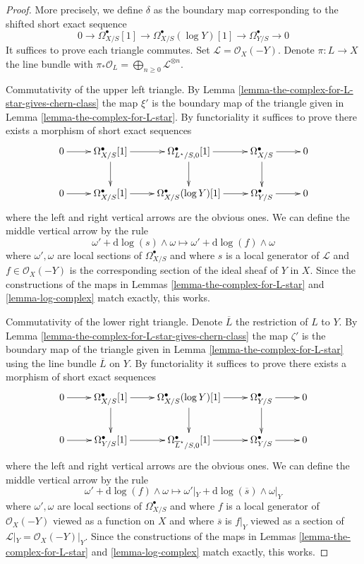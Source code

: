 \documentclass[10pt,a4paper]{amsart}
\theoremstyle{plain}
\theoremstyle{definition}
\theoremstyle{remark}
\numberwithin{equation}{subsection}
\begin{document}
\begin{proof}
More precisely, we define $\delta$ as the boundary map corresponding to the
shifted short exact sequence
$$
0 \to \Omega^\bullet_{X/S}[1] \to
\Omega^\bullet_{X/S}(\log Y)[1] \to
\Omega^\bullet_{Y/S} \to 0
$$
It suffices to prove each triangle commutes. Set
$\mathcal{L} = \mathcal{O}_X(-Y)$. Denote $\pi : L \to X$ the line bundle
with $\pi_*\mathcal{O}_L = \bigoplus_{n \geq 0} \mathcal{L}^{\otimes n}$.

\medskip\noindent
Commutativity of the upper left triangle.
By Lemma \ref{lemma-the-complex-for-L-star-gives-chern-class}
the map $\xi'$ is the boundary map of the triangle given in
Lemma \ref{lemma-the-complex-for-L-star}.
By functoriality it suffices to prove there exists a morphism of
short exact sequences
$$
\xymatrix{
0 \ar[r] &
\Omega^\bullet_{X/S}[1] \ar[r] \ar[d] &
\Omega^\bullet_{L^\star/S, 0}[1] \ar[r] \ar[d] &
\Omega^\bullet_{X/S} \ar[r] \ar[d] &
0 \\
0 \ar[r] &
\Omega^\bullet_{X/S}[1] \ar[r] &
\Omega^\bullet_{X/S}(\log Y)[1] \ar[r] &
\Omega^\bullet_{Y/S} \ar[r] &
0
}
$$
where the left and right vertical arrows are the obvious ones.
We can define the middle vertical arrow by the rule
$$
\omega' + \text{d}\log(s) \wedge \omega \longmapsto
\omega' + \text{d}\log(f) \wedge \omega
$$
where $\omega', \omega$ are local sections of $\Omega^\bullet_{X/S}$
and where $s$ is a local generator of $\mathcal{L}$ and
$f \in \mathcal{O}_X(-Y)$ is the corresponding section of the ideal
sheaf of $Y$ in $X$. Since the constructions of the maps in
Lemmas \ref{lemma-the-complex-for-L-star} and \ref{lemma-log-complex}
match exactly, this works.

\medskip\noindent
Commutativity of the lower right triangle. Denote
$\overline{L}$ the restriction of $L$ to $Y$.
By Lemma \ref{lemma-the-complex-for-L-star-gives-chern-class}
the map $\zeta'$ is the boundary map of the triangle given in
Lemma \ref{lemma-the-complex-for-L-star} using the line bundle
$\overline{L}$ on $Y$.
By functoriality it suffices to prove there exists a morphism of
short exact sequences
$$
\xymatrix{
0 \ar[r] &
\Omega^\bullet_{X/S}[1] \ar[r] \ar[d] &
\Omega^\bullet_{X/S}(\log Y)[1] \ar[r] \ar[d] &
\Omega^\bullet_{Y/S} \ar[r] \ar[d] &
0 \\
0 \ar[r] &
\Omega^\bullet_{Y/S}[1] \ar[r] &
\Omega^\bullet_{\overline{L}^\star/S, 0}[1] \ar[r] &
\Omega^\bullet_{Y/S} \ar[r] &
0 \\
}
$$
where the left and right vertical arrows are the obvious ones.
We can define the middle vertical arrow by the rule
$$
\omega' + \text{d}\log(f) \wedge \omega \longmapsto
\omega'|_Y + \text{d}\log(\overline{s}) \wedge \omega|_Y
$$
where $\omega', \omega$ are local sections of $\Omega^\bullet_{X/S}$
and where $f$ is a local generator of $\mathcal{O}_X(-Y)$ viewed as
a function on $X$ and where $\overline{s}$ is $f|_Y$ viewed as a
section of $\mathcal{L}|_Y = \mathcal{O}_X(-Y)|_Y$.
Since the constructions of the maps in
Lemmas \ref{lemma-the-complex-for-L-star} and \ref{lemma-log-complex}
match exactly, this works.
\end{proof}
\end{document}
